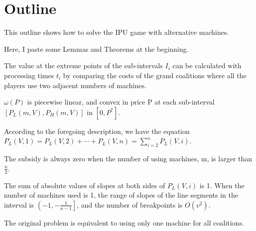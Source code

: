\section{Outline}

This outline shows how to solve the IPU game with alternative machines.

Here, I paste some Lemmas and Theorems at the beginning.

\begin{lem}\label{lem1}

The value at the extreme points of the sub-intervals $I_i$ can be calculated with processing times $t_i$ by comparing the costs of the grand coalitions where all the players use two adjacent numbers of machines.

\end{lem}

\begin{thm}\label{thm1}

$\omega(P)$ is piecewise linear, and convex in price P at each sub-interval $[P_L(m,V),P_H(m,V)]$ in $[0,P^*] $.

\end{thm}

\begin{thm}\label{thm2}

According to the foregoing description, we have the equation $P_L(V,1)=P_L(V,2)+\cdots+P_L(V,n)=\sum_{i=2}^n P_L(V,i)$.

\end{thm}

\begin{thm}\label{thm3}

The subsidy is always zero when the number of using machines, m, is larger than $\frac{n}{2}$.

\end{thm}


\begin{thm}\label{thm4}
The sum of absolute values of slopes at both sides of $P_L(V,i)$ is 1.
When the number of machines used is 1, the range of slopes of the line segments in the interval is $\left( -1 , -\frac{1}{n-1} \right]$, and the number of breakpoints is $ O(v^2) $.
\end{thm}


\begin{thm}\label{thm5}

The original problem is equivalent to using only one machine for all coalitions.

\end{thm}


